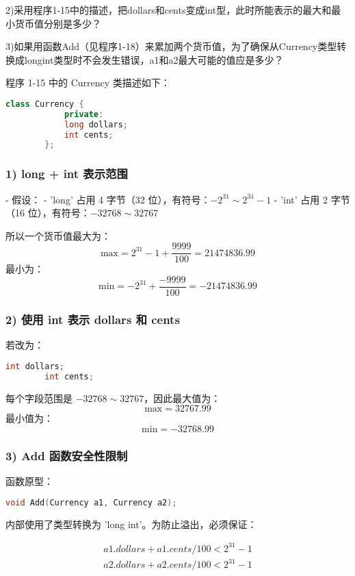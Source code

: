 \documentclass[UTF8]{ctexart}
\begin{document}
	2)采用程序1-15中的描述，把dollars和cents变成int型，此时所能表示的最大和最小货币值分别是多少？
	
	3)如果用函数Add（见程序1-18）来累加两个货币值，为了确保从Currency类型转换成longint类型时不会发生错误，a1和a2最大可能的值应是多少？
	
	程序 1-15 中的 Currency 类描述如下：
	\begin{lstlisting}[language=C++]
		class Currency {
			private:
			long dollars;
			int cents;
		};
	\end{lstlisting}
	
	\subsubsection{1) long + int 表示范围}
	- 假设：
	- 'long' 占用 4 字节（32 位），有符号：$ -2^{31} \sim 2^{31}-1 $
	- 'int' 占用 2 字节（16 位），有符号：$ -32768 \sim 32767 $
	
	所以一个货币值最大为：
	$$
	\text{max} = 2^{31}-1 + \frac{9999}{100} = 21474836.99
	$$
	最小为：
	$$
	\text{min} = -2^{31} + \frac{-9999}{100} = -21474836.99
	$$
	
	\subsubsection{2) 使用 int 表示 dollars 和 cents}
	
	若改为：
	\begin{lstlisting}[language=C++]
		int dollars;
		int cents;
	\end{lstlisting}
	
	每个字段范围是 $-32768 \sim 32767$，因此最大值为：
	$$
	\text{max} = 32767.99
	$$
	最小值为：
	$$
	\text{min} = -32768.99
	$$
	
	\subsubsection{3) Add 函数安全性限制}
	
	函数原型：
	\begin{lstlisting}[language=C++]
		void Add(Currency a1, Currency a2);
	\end{lstlisting}
	
	内部使用了类型转换为 'long int'。为防止溢出，必须保证：
	
	\begin{align}
	a1.dollars + a1.cents / 100 < 2^{31}-1 \\
	a2.dollars + a2.cents / 100 < 2^{31}-1
		\end{align}
	
\end{document}
